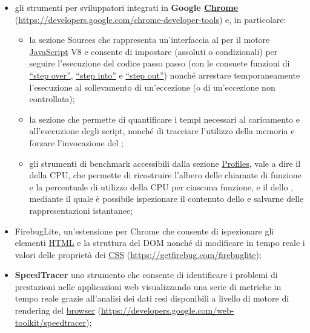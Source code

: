 {\begin{itemize}
 \begin{itemize}
   \item \textbf{Unicorn} in qualità di strumento di validazione unificato (\url{http://validator.w3.org/unicorn});
   \item \textbf{CSS Valitatom Service} come utilità di validazione per i fogli di stile a cascata (\url{http://jigsaw.w3.org/css-validator});
 \end{itemize}
 \item gli strumenti per sviluppatori integrati in \textbf{Google \underline{Chrome}} (\url{https://developers.google.com/chrome-developer-tools}) e, in particolare:
   \begin{itemize}
   \item la sezione Sources che rappresenta un'interfaccia al \underline{} per il motore \underline{JavaScript} V8 e consente di impostare \underline{} (assoluti o condizionali) per seguire l'esecuzione del codice passo passo (con le consuete funzioni di \underline{``step over''}, \underline{``step into''} e \underline{``step out''}) nonché arrestare temporaneamente l'esecuzione al sollevamento di un'eccezione (o di un'eccezione non controllata);
   \item la sezione  che permette di quantificare i tempi necessari al caricamento e all'esecuzione degli script, nonché di tracciare l'utilizzo della memoria e forzare l'invocazione del ;
   \item  gli strumenti di benchmark accessibili dalla sezione \underline{Profiles}, vale a dire il  della CPU, che permette di ricostruire l'albero delle chiamate di funzione e la percentuale di utilizzo della CPU per ciascuna funzione, e il  dello , mediante il quale è possibile ispezionare il contenuto dello  e salvarne delle rappresentazioni istantanee;
   \end{itemize}
  \item FirebugLite, un'estensione per Chrome che consente di ispezionare gli elementi \underline{HTML} e la struttura del DOM nonché di modificare in tempo reale i valori delle proprietà dei \underline{CSS} (\url{https://getfirebug.com/firebuglite});
  \item \textbf{SpeedTracer} uno strumento che consente di identificare i problemi di prestazioni nelle applicazioni web visualizzando una serie di metriche in tempo reale grazie all'analisi dei dati resi disponibili a livello di motore di rendering del \underline{browser} (\url{https://developers.google.com/web-toolkit/speedtracer});

\end{itemize}}
